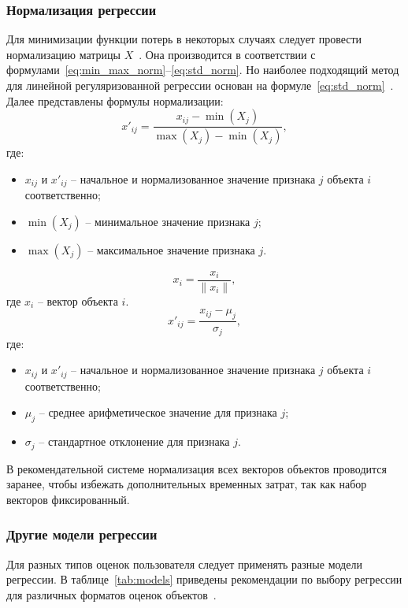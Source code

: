\subsubsection{Нормализация регрессии}
Для минимизации функции потерь в некоторых случаях следует провести нормализацию матрицы $X$~\cite{aggarwal}.
Она производится в соответствии с формулами~\eqref{eq:min_max_norm}--\eqref{eq:std_norm}.
Но наиболее подходящий метод для линейной регуляризованной регрессии основан на формуле~\eqref{eq:std_norm}~\cite{aggarwal}.
Далее представлены формулы нормализации:
\begin{equation}
	\label{eq:min_max_norm}
	x'_{ij}=\frac{x_{ij}-\operatorname{min}(X_j)}{\operatorname{max}(X_j) - \operatorname{min}(X_j)},
\end{equation}
где:
\begin{itemize}
	\item $x_{ij}$ и $x'_{ij}$ -- начальное и нормализованное значение признака $j$ объекта $i$ соответственно;
	\item $\operatorname{min}(X_j)$ -- минимальное значение признака $j$;
	\item $\operatorname{max}(X_j)$ -- максимальное значение признака $j$.
\end{itemize}
\begin{equation}
	\label{eq:unit_norm}
	x_i = \frac{x_i}{\lVert x_i \rVert},
\end{equation}
где $x_i$ -- вектор объекта $i$.
\begin{equation}
	\label{eq:std_norm}
	x'_{ij}=\frac{x_{ij}-\mu_j}{\sigma_j},
\end{equation}
где:
\begin{itemize}
	\item $x_{ij}$ и $x'_{ij}$ -- начальное и нормализованное значение признака $j$ объекта $i$ соответственно;
	\item $\mu_j$ -- среднее арифметическое значение для признака $j$;
	\item $\sigma_j$ -- стандартное отклонение для признака $j$.
\end{itemize}
В рекомендательной системе нормализация всех векторов объектов проводится заранее, чтобы избежать дополнительных временных затрат, так как набор векторов фиксированный.

\subsubsection{Другие модели регрессии}
Для разных типов оценок пользователя следует применять разные модели регрессии.
В таблице~\ref{tab:models} приведены рекомендации по выбору регрессии для различных форматов оценок объектов~\cite{aggarwal}.

